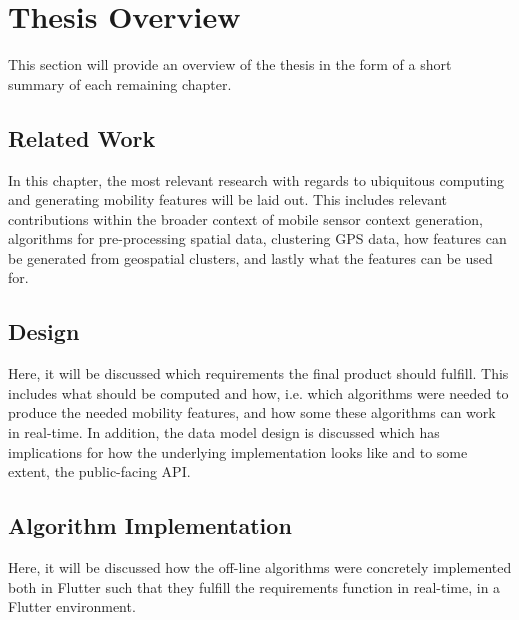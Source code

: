 \section{Thesis Overview}
This section will provide an overview of the thesis in the form of a short summary of each remaining chapter.

\subsection*{Related Work}
In this chapter, the most relevant research with regards to ubiquitous computing and generating mobility features will be laid out. This includes relevant contributions within the broader context of mobile sensor context generation, algorithms for pre-processing spatial data, clustering GPS data, how features can be generated from geospatial clusters, and lastly what the features can be used for.

\subsection*{Design}
Here, it will be discussed which requirements the final product should fulfill. This includes what should be computed and how, i.e. which algorithms were needed to produce the needed mobility features, and how some these algorithms can work in real-time. In addition, the data model design is discussed which has implications for how the underlying implementation looks like and to some extent, the public-facing API.

\subsection*{Algorithm Implementation}
Here, it will be discussed how the off-line algorithms were concretely implemented both in Flutter such that they fulfill the requirements function in real-time, in a Flutter environment.

